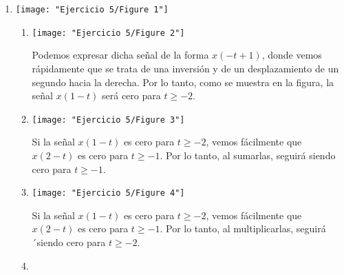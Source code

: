 \begin{enumerate}[label=\color{red}\textbf{\arabic*)}]
\begin{enumerate}[label=\color{red}\textbf{\alph*)}]
    \end{enumerate}
  \item {}
\begin{center}
\texttt{[image: "Ejercicio 5/Figure 1"]}
\end{center}
    \begin{enumerate}[label=\color{red}\textbf{\alph*)}]
      \item {} 

\begin{minipage}{0.45\textwidth}
\texttt{[image: "Ejercicio 5/Figure 2"]}
\end{minipage} \begin{minipage}{0.45\textwidth}
Podemos expresar dicha señal de la forma $x(-t+1)$, donde vemos rápidamente que se trata de una inversión y de un desplazamiento de un segundo hacia la derecha. Por lo tanto, como se muestra en la figura, la señal  $x(1-t)$ será cero para  $t\ge -2$.
\end{minipage}

      \item {} 

\begin{minipage}{0.45\textwidth}
\texttt{[image: "Ejercicio 5/Figure 3"]} 
\end{minipage}\begin{minipage}{0.45\textwidth}
Si la señal $x(1-t)$ es cero para  $t\ge -2$, vemos fácilmente que $x(2-t)$ es cero para  $t\ge -1$. Por lo tanto, al sumarlas, seguirá siendo cero para $t\ge -1$.
\end{minipage}

      \item {} 
      
      \begin{minipage}{0.45\textwidth}
      \texttt{[image: "Ejercicio 5/Figure 4"]}
      \end{minipage} \begin{minipage}{0.45\textwidth}
      Si la señal $x(1-t)$ es cero para  $t\ge -2$, vemos fácilmente que $x(2-t)$ es cero para  $t\ge -1$. Por lo tanto, al multiplicarlas, seguirá ´siendo cero para $t\ge -2$.
      \end{minipage}

      \item {} 
      

\end{enumerate}
\end{enumerate}
